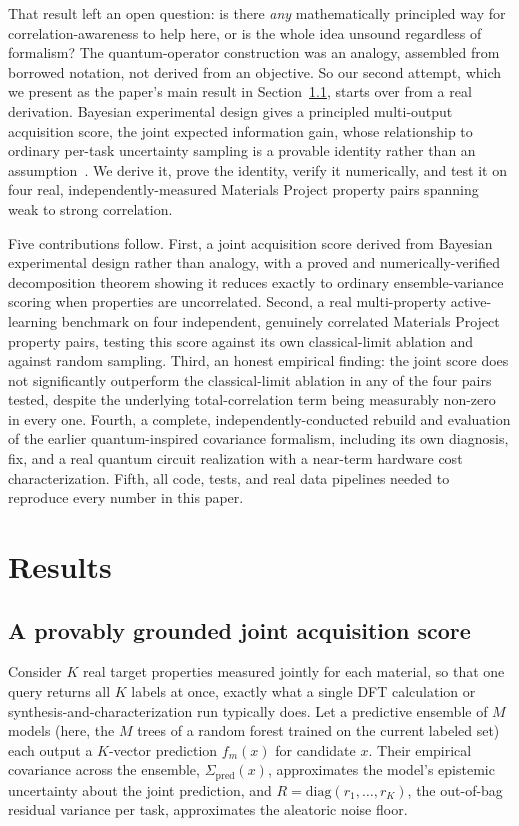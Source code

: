 \documentclass[10pt]{article}
\begin{document}
That result left an open question: is there \emph{any} mathematically principled way for correlation-awareness to help here, or is the whole idea unsound regardless of formalism? The quantum-operator construction was an analogy, assembled from borrowed notation, not derived from an objective. So our second attempt, which we present as the paper's main result in Section~\ref{sec:jeig}, starts over from a real derivation. Bayesian experimental design gives a principled multi-output acquisition score, the joint expected information gain, whose relationship to ordinary per-task uncertainty sampling is a provable identity rather than an assumption~\cite{mackay1992information,houlsby2011bayesian,cover2006elements,watanabe1960information}. We derive it, prove the identity, verify it numerically, and test it on four real, independently-measured Materials Project property pairs spanning weak to strong correlation.

Five contributions follow. First, a joint acquisition score derived from Bayesian experimental design rather than analogy, with a proved and numerically-verified decomposition theorem showing it reduces exactly to ordinary ensemble-variance scoring when properties are uncorrelated. Second, a real multi-property active-learning benchmark on four independent, genuinely correlated Materials Project property pairs, testing this score against its own classical-limit ablation and against random sampling. Third, an honest empirical finding: the joint score does not significantly outperform the classical-limit ablation in any of the four pairs tested, despite the underlying total-correlation term being measurably non-zero in every one. Fourth, a complete, independently-conducted rebuild and evaluation of the earlier quantum-inspired covariance formalism, including its own diagnosis, fix, and a real quantum circuit realization with a near-term hardware cost characterization. Fifth, all code, tests, and real data pipelines needed to reproduce every number in this paper.

\section{Results}

\subsection{A provably grounded joint acquisition score}\label{sec:jeig}

Consider $K$ real target properties measured jointly for each material, so that one query returns all $K$ labels at once, exactly what a single DFT calculation or synthesis-and-characterization run typically does. Let a predictive ensemble of $M$ models (here, the $M$ trees of a random forest trained on the current labeled set) each output a $K$-vector prediction $f_m(x)$ for candidate $x$. Their empirical covariance across the ensemble, $\Sigma_{\mathrm{pred}}(x)$, approximates the model's epistemic uncertainty about the joint prediction, and $R=\mathrm{diag}(r_1,\ldots,r_K)$, the out-of-bag residual variance per task, approximates the aleatoric noise floor.
\end{document}
